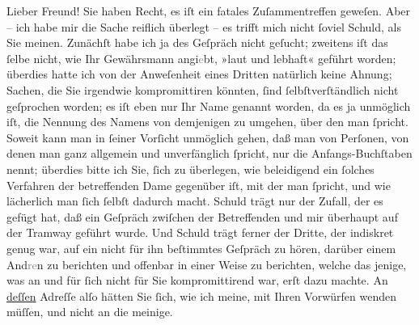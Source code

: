 \pstart\center{}Lieber Freund!\pend\vspace{0.5em}
\pstart
           Sie haben Recht, es iſt ein fatales Zuſammentreffen geweſen. Aber – ich habe mir die
               Sache reiflich überlegt – es trifft mich nicht ſoviel Schuld, als Sie meinen.
               Zunächſt habe ich ja des Geſpräch nicht geſucht; zweitens iſt das ſelbe nicht, wie
               Ihr Gewährsmann
                  angi\textcolor{gray}{e}bt, »laut und lebhaft« geführt worden; überdies hatte ich
               von der Anweſenheit eines Dritten natürlich keine Ahnung; Sachen, die Sie irgendwie kompromittiren
               könnten, ſind ſelbſtverſtändlich nicht geſprochen worden; es iſt eben nur Ihr Name
               genannt worden, da es ja unmöglich iſt, die Nennung des Namens von demjenigen zu
               umgehen, über den man ſpricht. Soweit kann man in ſeiner Vorſicht unmöglich gehen,
               daß man von Perſonen, von denen man ganz {\pb}allgemein
               und unverfänglich ſpricht, nur die Anfangs-Buchſtaben nennt; überdies bitte ich Sie,
               ſich zu überlegen, wie beleidigend ein ſolches Verfahren der betreffenden Dame gegenüber iſt, mit der
               man ſpricht, und wie lächerlich man ſich ſelbſt dadurch macht. Schuld trägt nur der
               Zufall, der es gefügt hat, daß ein Geſpräch zwiſchen der Betreffenden und mir überhaupt auf der
               Tramway geführt wurde. Und Schuld trägt ferner der Dritte, der indiskret genug war, auf ein
               nicht für ihn beſtimmtes Geſpräch zu hören, darüber einem And\textcolor{gray}{re}n
               zu berichten und offenbar in einer Weise zu berichten, welche das jenige, was an  und für ſich nicht \introOben{}für Sie\introOben{}
               kompromittirend war, erſt dazu machte. An \uline{deſſen}
               Adreſſe alſo hätten Sie ſich, wie ich meine, mit Ihren Vorwürfen wenden müſſen, und
               nicht an die meinige.\pend
           
